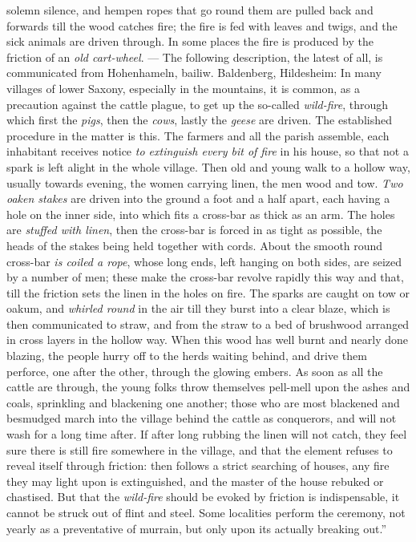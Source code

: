 \documentclass[a4paper, 11pt, oneside, polutonikogreek, english]{article}
\begin{document}
solemn silence, and hempen ropes that go round them are pulled back and forwards till the wood catches fire; the fire is fed with leaves and twigs, and the sick animals are driven through. In some places the fire is produced by the friction of an \emph{old cart-wheel}. --- The following description, the latest of all, is communicated from Hohenhameln, bailiw. Baldenberg, Hildesheim: In many villages of lower Saxony, especially in the mountains, it is common, as a precaution against the cattle plague, to get up the so-called \emph{wild-fire}, through which first the \emph{pigs}, then the \emph{cows}, lastly the \emph{geese} are driven. The established procedure in the matter is this. The farmers and all the parish assemble, each inhabitant receives notice \emph{to extinguish every bit of fire} in his house, so that not a spark is left alight in the whole village. Then old and young walk to a hollow way, usually towards evening, the women carrying linen, the men wood and tow. \emph{Two oaken stakes} are driven into the ground a foot and a half apart, each having a hole on the inner side, into which fits a cross-bar as thick as an arm. The holes are \emph{stuffed with linen}, then the cross-bar is forced in as tight as possible, the heads of the stakes being held together with cords. About the smooth round cross-bar \emph{is coiled a rope}, whose long ends, left hanging on both sides, are seized by a number of men; these make the cross-bar revolve rapidly this way and that, till the friction sets the linen in the holes on fire. The sparks are caught on tow or oakum, and \emph{whirled round} in the air till they burst into a clear blaze, which is then communicated to straw, and from the straw to a bed of brushwood arranged in cross layers in the hollow way. When this wood has well burnt and nearly done blazing, the people hurry off to the herds waiting behind, and drive them perforce, one after the other, through the glowing embers. As soon as all the cattle are through, the young folks throw themselves pell-mell upon the ashes and coals, sprinkling and blackening one another; those who are most blackened and besmudged march into the village behind the cattle as conquerors, and will not wash for a long time after. If after long rubbing the linen will not catch, they feel sure there is still fire somewhere in the village, and that the element refuses to reveal itself through friction: then follows a strict searching of houses, any fire they may light upon is extinguished, and the master of the house rebuked or chastised. But that the \emph{wild-fire} should be evoked by friction is indispensable, it cannot be struck out of flint and steel. Some localities perform the ceremony, not yearly as a preventative of murrain, but only upon its actually breaking out.''
\end{document}
